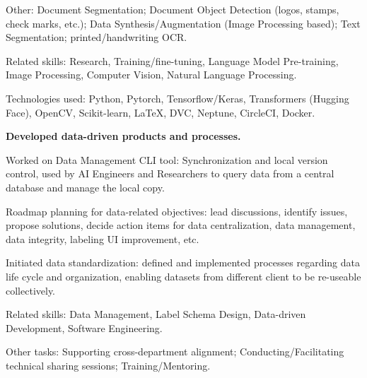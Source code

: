 \begin{xitemize}
\begin{zitemize}
        \item Other: Document Segmentation; Document Object Detection (logos, stamps, check marks, etc.);
        Data Synthesis/Augmentation (Image Processing based); Text Segmentation;
        printed/handwriting OCR.
        \item Related skills: Research, Training/fine-tuning, Language Model Pre-training, Image Processing, Computer Vision, Natural Language Processing.
        \item Technologies used: Python, Pytorch, Tensorflow/Keras, Transformers (Hugging Face),
        OpenCV, Scikit-learn, \LaTeX, DVC, Neptune, CircleCI, Docker.
    \end{zitemize}
    \item \textbf{Developed data-driven products and processes.}
    \begin{zitemize}
        \item Worked on Data Management CLI tool: Synchronization and local version control, used by AI Engineers and Researchers to query data from a central database and manage the local copy.
        \item Roadmap planning for data-related objectives: lead discussions, identify issues, propose solutions, decide action items for data centralization, data management, data integrity, labeling UI improvement, etc.
        \item Initiated data standardization: defined and implemented processes regarding data life cycle and organization, enabling datasets from different client to be re-useable collectively.
        \item Related skills: Data Management, Label Schema Design, Data-driven Development, Software Engineering.
    \end{zitemize}
    \item Other tasks: Supporting cross-department alignment; Conducting/Facilitating technical sharing sessions; Training/Mentoring.
\end{xitemize}

